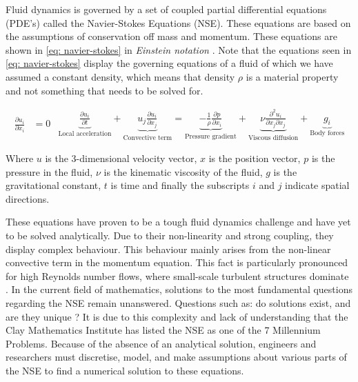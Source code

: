 \label{sect: 2.2turbflows}
Fluid dynamics is governed by a set of coupled partial differential equations (PDE's) called the Navier-Stokes Equations (NSE). These equations are based on the assumptions of conservation off mass and momentum. These equations are shown in \ref{eq: navier-stokes} in \textit{Einstein notation} \cite{Turbulence}. Note that the equations seen in \ref{eq: navier-stokes} display the governing equations of a fluid of which we have assumed a constant density, which means that density $\rho$ is a material property and not something that needs to be solved for.

\begin{subequations} \label{eq: navier-stokes}

    \begin{equation} \label{eq: continuity}
    \begin{aligned}
    \frac{\partial u_i}{\partial x_i} &= 0
    \end{aligned}
    \end{equation}

    \begin{equation} \label{eq: momentum}
    \begin{aligned}
   \underbrace{ \frac{\partial u_i}{\partial t} }_{\text{Local acceleration}}
+ 
\underbrace{ u_j \frac{\partial u_i}{\partial x_j} }_{\text{Convective term}}
= 
\underbrace{ -\frac{1}{\rho} \frac{\partial p}{\partial x_i} }_{\text{Pressure gradient}}
+ 
\underbrace{ \nu \frac{\partial^2 u_i}{\partial x_j \partial x_j} }_{\text{Viscous diffusion}}
+ 
\underbrace{ g_i }_{\text{Body forces}}
    \end{aligned}
    \end{equation}
\end{subequations}

Where $u$ is the 3-dimensional velocity vector, $x$ is the position vector, $p$ is the pressure in the fluid, $\nu$ is the kinematic viscosity of the fluid, $g$ is the gravitational constant, $t$ is time and finally the subscripts $i$ and $j$ indicate spatial directions.

These equations have proven to be a tough fluid dynamics challenge and have yet to be solved analytically. Due to their non-linearity and strong coupling, they display complex behaviour. This behaviour mainly arises from the non-linear convective term in the momentum equation. This fact is particularly pronounced for high Reynolds number flows, where small-scale turbulent structures dominate \cite{Turbulence}. In the current field of mathematics, solutions to the most fundamental questions regarding the NSE remain unanswered. Questions such as: do solutions exist, and are they unique \cite{clay_navierstokes}? It is due to this complexity and lack of understanding that the Clay Mathematics Institute has listed the NSE as one of the 7 Millennium Problems. Because of the absence of an analytical solution, engineers and researchers must discretise, model, and make assumptions about various parts of the NSE to find a numerical solution to these equations. 

